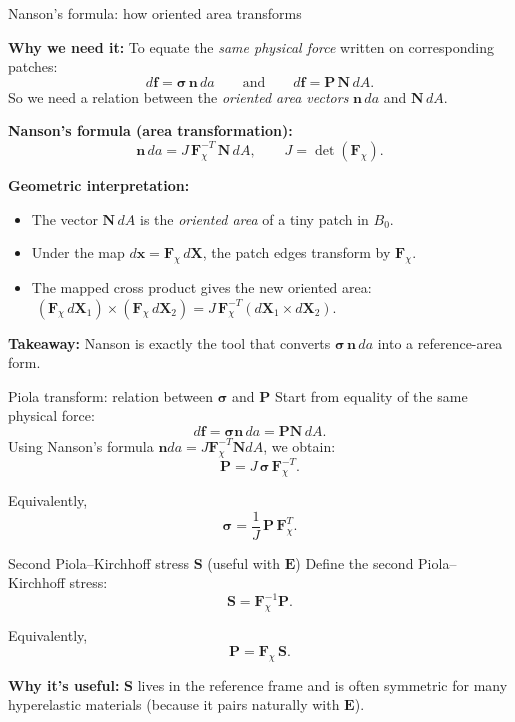 \documentclass[aspectratio=169]{beamer}
\newcommand{\x}{\bm{x}}
\newcommand{\X}{\bm{X}}
\newcommand{\Eten}{\bm{E}}     %
\newcommand{\sigmaC}{\bm{\sigma}} %
\newcommand{\Sten}{\bm{S}}     %
\newcommand{\Nvec}{\bm{N}}     %
\newcommand{\nvec}{\bm{n}}     %
\newcommand{\Fdef}{\bm{F}_{\chi}}  %
\newcommand{\Pten}{\bm{P}}         %
\begin{document}
\begin{frame}{Nanson's formula: how oriented area transforms}
\small

\textbf{Why we need it:} To equate the \emph{same physical force} written on corresponding patches:
\[
d\bm{f} = \sigmaC\,\nvec\,da
\qquad \text{and} \qquad
d\bm{f} = \Pten\,\Nvec\,dA.
\]
So we need a relation between the \emph{oriented area vectors} \(\nvec\,da\) and \(\Nvec\,dA\).

\medskip
\textbf{Nanson's formula (area transformation):}
\[
\nvec\, da = J\, \Fdef^{-T}\, \Nvec\, dA,
\qquad J=\det(\Fdef).
\]

\medskip
\textbf{Geometric interpretation:}
\begin{itemize}
\item The vector \(\Nvec\,dA\) is the \emph{oriented area} of a tiny patch in \(B_0\).
\item Under the map \(d\x=\Fdef\,d\X\), the patch edges transform by \(\Fdef\).
\item The mapped cross product gives the new oriented area:
      \(\;(\Fdef\,d\X_1)\times(\Fdef\,d\X_2)=J\,\Fdef^{-T}(d\X_1\times d\X_2)\).
\end{itemize}

\medskip
\textbf{Takeaway:} Nanson is exactly the tool that converts \(\sigmaC\,\nvec\,da\) into a reference-area form.
\end{frame}


\begin{frame}{Piola transform: relation between \(\sigmaC\) and \(\Pten\)}
\small
Start from equality of the same physical force:
\[
d\bm{f}=\sigmaC\nvec\, da = \Pten\Nvec\, dA.
\]
Using Nanson's formula \(\nvec da = J\Fdef^{-T}\Nvec dA\), we obtain:
\[
\Pten = J\,\sigmaC\,\Fdef^{-T}.
\]

Equivalently,
\[
\sigmaC = \frac{1}{J}\,\Pten\,\Fdef^{T}.
\]
\end{frame}

\begin{frame}{Second Piola--Kirchhoff stress \(\Sten\) (useful with \(\Eten\))}
\small
Define the second Piola--Kirchhoff stress:
\[
\Sten = \Fdef^{-1}\Pten.
\]

Equivalently,
\[
\Pten = \Fdef\,\Sten.
\]

\medskip
\textbf{Why it’s useful:} \(\Sten\) lives in the reference frame and is often symmetric for many hyperelastic materials
(because it pairs naturally with \(\Eten\)).

\end{frame}
\end{document}
